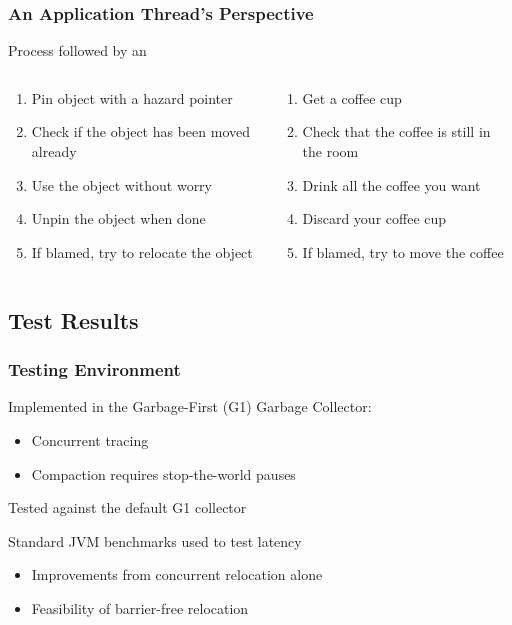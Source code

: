 \documentclass{beamer}
\newcommand{\linespace}{\vskip 0.25cm}
\begin{document}
\begin{frame}

\frametitle{An Application Thread's Perspective}

Process followed by an \color{red}{application thread}\color{black}{:}
\linespace

\begin{columns}
\begin{column}{0.5\textwidth}
\begin{enumerate}
\item Pin object with a hazard pointer
\item Check if the object has been moved already
\item Use the object without worry
\item Unpin the object when done
\item If blamed, try to relocate the object
\end{enumerate}
\end{column}

\begin{column}{0.5\textwidth}
\begin{enumerate}
\item Get a coffee cup
\item Check that the coffee is still in the room
\item Drink all the coffee you want
\item Discard your coffee cup
\item If blamed, try to move the coffee
\end{enumerate}
\end{column}
\end{columns}

\end{frame}



\subsection*{Test Results}

\begin{frame}

\frametitle{Testing Environment}

Implemented in the Garbage-First (G1) Garbage Collector:
\begin{itemize}
\item Concurrent tracing
\item Compaction requires stop-the-world pauses
\end{itemize}

\linespace
\linespace

Tested against the default G1 collector

\linespace
\linespace

Standard JVM benchmarks used to test latency
\begin{itemize}
\item Improvements from concurrent relocation alone
\item Feasibility of barrier-free relocation
\end{itemize}

\end{frame}
\end{document}
